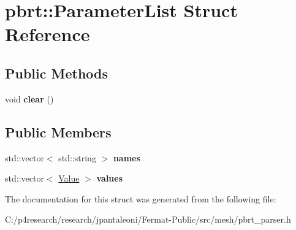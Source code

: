 \hypertarget{structpbrt_1_1_parameter_list}{}\section{pbrt\+:\+:Parameter\+List Struct Reference}
\label{structpbrt_1_1_parameter_list}
\subsection*{Public Methods}
\begin{DoxyCompactItemize}
\item 
\mbox{\label{structpbrt_1_1_parameter_list_aa061435aa33120a1138d9ff3ec883c67}} 
void {\bfseries clear} ()
\end{DoxyCompactItemize}
\subsection*{Public Members}
\begin{DoxyCompactItemize}
\item 
\mbox{\label{structpbrt_1_1_parameter_list_a8f1175ed305944acbc872db2306d5d67}} 
std\+::vector$<$ std\+::string $>$ {\bfseries names}
\item 
\mbox{\label{structpbrt_1_1_parameter_list_af5d6cb13beff62d524976966384ac855}} 
std\+::vector$<$ \hyperlink{structpbrt_1_1_value}{Value} $>$ {\bfseries values}
\end{DoxyCompactItemize}


The documentation for this struct was generated from the following file\+:\begin{DoxyCompactItemize}
\item 
C\+:/p4research/research/jpantaleoni/\+Fermat-\/\+Public/src/mesh/pbrt\+\_\+parser.\+h\end{DoxyCompactItemize}
